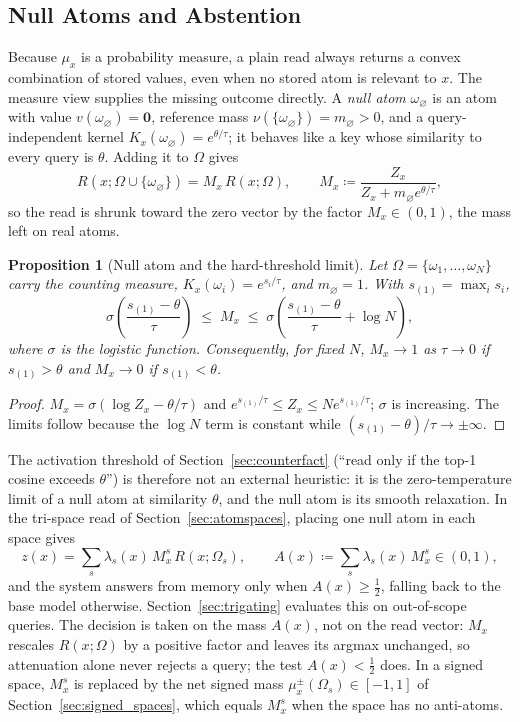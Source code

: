 \documentclass[preprint,12pt]{elsarticle}
\newtheorem{proposition}{Proposition}
\newcommand{\Om}{\Omega}
\newif\ifmarkchanges
\newcommand{\revii}[1]{\ifmarkchanges{\color{blue}#1}\else#1\fi} %
\providecommand{\DIFaddbegin}{} %
\providecommand{\DIFaddend}{} %
\providecommand{\DIFaddincludegraphics}[2][]{{\color{blue}\fbox{\DIFOincludegraphics[#1]{#2}}}} %
\DeclareRobustCommand{\DIFaddbegin}{\DIFOaddbegin \let\includegraphics\DIFaddincludegraphics} %
\DeclareRobustCommand{\DIFaddend}{\DIFOaddend \let\includegraphics\DIFOincludegraphics} %
\begin{document}
\subsection{Null Atoms and Abstention}
\label{sec:null_atoms}

Because $\mu_x$ is a probability measure, a plain read always returns a convex combination of stored values, even when no stored atom is relevant to $x$. The measure view supplies the missing outcome directly. A \emph{null atom} $\omega_\varnothing$ is an atom with value $v(\omega_\varnothing)=\mathbf 0$, reference mass $\nu(\{\omega_\varnothing\})=m_\varnothing>0$, and a query-independent kernel $K_x(\omega_\varnothing)=e^{\theta/\tau}$; it behaves like a key whose similarity to every query is $\theta$. Adding it to $\Om$ gives
\[
  R(x;\Om\cup\{\omega_\varnothing\}) = M_x\,R(x;\Om), \qquad
  M_x \coloneqq \frac{Z_x}{Z_x+m_\varnothing e^{\theta/\tau}},
\]
so the read is shrunk toward the zero vector by the factor $M_x\in(0,1)$, the mass left on real atoms.

\begin{proposition}[Null atom and the hard-threshold limit]
\label{prop:null_atom}
Let $\Om=\{\omega_1,\dots,\omega_N\}$ carry the counting measure, $K_x(\omega_i)=e^{s_i/\tau}$, and $m_\varnothing=1$. With $s_{(1)}=\max_i s_i$,
\[
  \sigma\!\left(\frac{s_{(1)}-\theta}{\tau}\right) \;\le\; M_x \;\le\; \sigma\!\left(\frac{s_{(1)}-\theta}{\tau}+\log N\right),
\]
where $\sigma$ is the logistic function. Consequently, for fixed $N$, $M_x\to 1$ as $\tau\to 0$ if $s_{(1)}>\theta$ and $M_x\to 0$ if $s_{(1)}<\theta$.
\end{proposition}

\begin{proof}
$M_x=\sigma(\log Z_x-\theta/\tau)$ and $e^{s_{(1)}/\tau}\le Z_x\le N e^{s_{(1)}/\tau}$; $\sigma$ is increasing. The limits follow because the $\log N$ term is constant while $(s_{(1)}-\theta)/\tau\to\pm\infty$. \qedhere
\end{proof}

The activation threshold of Section~\ref{sec:counterfact} (``read only if the top-1 cosine exceeds $\theta$'') is therefore not an external heuristic: it is the zero-temperature limit of a null atom at similarity $\theta$, and the null atom is its smooth relaxation. In the tri-space read of Section~\ref{sec:atomspaces}, placing one null atom in each space gives
\[
  z(x)=\sum_{s}\lambda_s(x)\,M_{x}^{s}\,R(x;\Om_s), \qquad A(x)\coloneqq\sum_s\lambda_s(x)\,M_x^s\in(0,1),
\]
and the system answers from memory only when $A(x)\ge\tfrac12$, falling back to the base model otherwise. Section~\ref{sec:trigating} evaluates this on out-of-scope queries. \DIFaddbegin \revii{The decision is taken on the mass $A(x)$, not on the read vector: $M_x$ rescales $R(x;\Om)$ by a positive factor and leaves its argmax unchanged, so attenuation alone never rejects a query; the test $A(x)<\tfrac12$ does. In a signed space, $M_x^s$ is replaced by the net signed mass $\mu_x^{\pm}(\Om_s)\in[-1,1]$ of Section~\ref{sec:signed_spaces}, which equals $M_x^s$ when the space has no anti-atoms.}
\DIFaddend 
\end{document}
